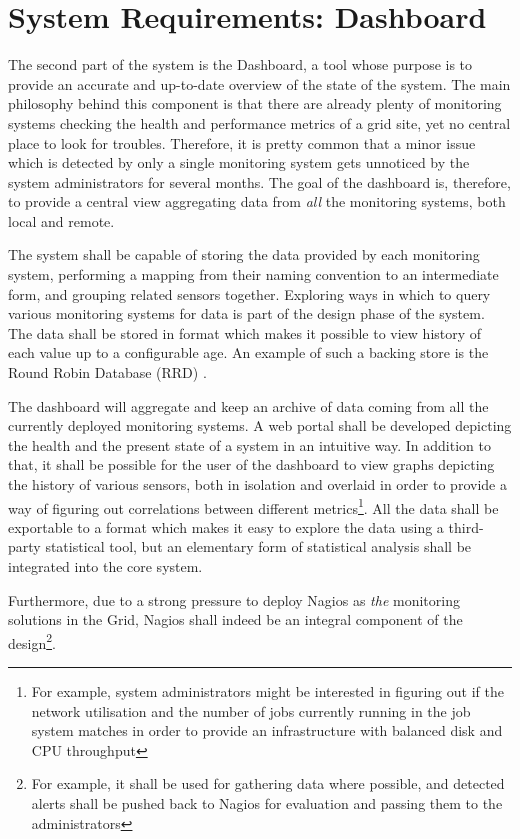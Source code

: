 \documentclass[12pt]{article}
\begin{document}
\section{System Requirements: Dashboard}

The second part of the system is the Dashboard, a tool whose purpose is to provide an accurate and up-to-date overview of the
state of the system.  The main philosophy behind this component is that there are already plenty of monitoring systems checking
the health and performance metrics of a grid site, yet no central place to look for troubles.  Therefore, it is pretty common that
a minor issue which is detected by only a single monitoring system gets unnoticed by the system administrators for several months.
The goal of the dashboard is, therefore, to provide a central view aggregating data from {\em all} the monitoring systems, both
local and remote.

The system shall be capable of storing the data provided by each monitoring system, performing a mapping from their naming
convention to an intermediate form, and grouping related sensors together.  Exploring ways in which to query various monitoring
systems for data is part of the design phase of the system.  The data shall be stored in format which makes it possible to view
history of each value up to a configurable age.  An example of such a backing store is the Round Robin Database (RRD) \cite{rrd}.

The dashboard will aggregate and keep an archive of data coming from all the currently deployed monitoring systems.  A web portal
shall be developed depicting the health and the present state of a system in an intuitive way.  In addition to that, it shall be
possible for the user of the dashboard to view graphs depicting the history of various sensors, both in isolation and overlaid in
order to provide a way of figuring out correlations between different metrics\footnote{For example, system administrators might be
interested in figuring out if the network utilisation and the number of jobs currently running in the job system matches in order
to provide an infrastructure with balanced disk and CPU throughput}.  All the data shall be exportable to a format which makes it
easy to explore the data using a third-party statistical tool, but an elementary form of statistical analysis shall be integrated
into the core system.

Furthermore, due to a strong pressure to deploy Nagios as {\em the} monitoring solutions in the Grid, Nagios shall indeed be an
integral component of the design\footnote{For example, it shall be used for gathering data where possible, and detected alerts
shall be pushed back to Nagios for evaluation and passing them to the administrators}.
\end{document}
